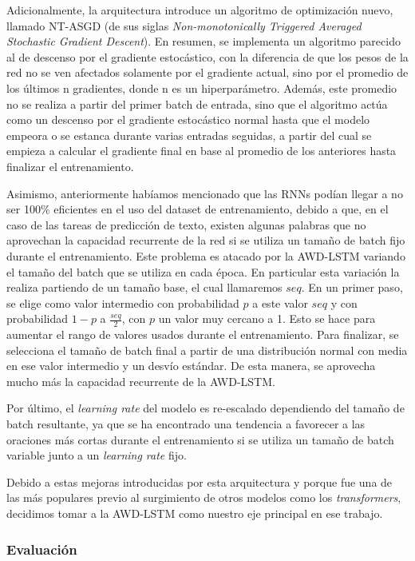 Adicionalmente, la arquitectura introduce un algoritmo de optimización nuevo, llamado NT-ASGD (de sus siglas \textit{Non-monotonically Triggered Averaged Stochastic Gradient Descent}). En resumen, se implementa un algoritmo parecido al de descenso por el gradiente estocástico, con la diferencia de que los pesos de la red no se ven afectados solamente por el gradiente actual, sino por el promedio de los últimos n gradientes, donde n es un hiperparámetro. Además, este promedio no se realiza a partir del primer batch de entrada, sino que el algoritmo actúa como un descenso por el gradiente estocástico normal hasta que el modelo empeora o se estanca durante varias entradas seguidas, a partir del cual se empieza a calcular el gradiente final en base al promedio de los anteriores hasta finalizar el entrenamiento.

Asimismo, anteriormente habíamos mencionado que las RNNs podían llegar a no ser 100\% eficientes en el uso del dataset de entrenamiento, debido a que, en el caso de las tareas de predicción de texto, existen algunas palabras que no aprovechan la capacidad recurrente de la red si se utiliza un tamaño de batch fijo durante el entrenamiento. Este problema es atacado por la AWD-LSTM variando el tamaño del batch que se utiliza en cada época. En particular esta variación la realiza partiendo de un tamaño base, el cual llamaremos $seq$. En un primer paso, se elige como valor intermedio con probabilidad $p$ a este valor $seq$ y con probabilidad $1-p$ a $\frac{seq}{2}$, con $p$ un valor muy cercano a 1. Esto se hace para aumentar el rango de valores usados durante el entrenamiento. Para finalizar, se selecciona el tamaño de batch final a partir de una distribución normal con media en ese valor intermedio y un desvío estándar. De esta manera, se aprovecha mucho más la capacidad recurrente de la AWD-LSTM.

Por último, el \textit{learning rate} del modelo es re-escalado dependiendo del tamaño de batch resultante, ya que se ha encontrado una tendencia a favorecer a las oraciones más cortas durante el entrenamiento si se utiliza un tamaño de batch variable junto a un \textit{learning rate} fijo. \parencite{merity2017regularizingoptimizinglstmlanguage}

Debido a estas mejoras introducidas por esta arquitectura y porque fue una de las más populares previo al surgimiento de otros modelos como los \textit{transformers}, decidimos tomar a la AWD-LSTM como nuestro eje principal en ese trabajo.

\subsubsection{Evaluación}

